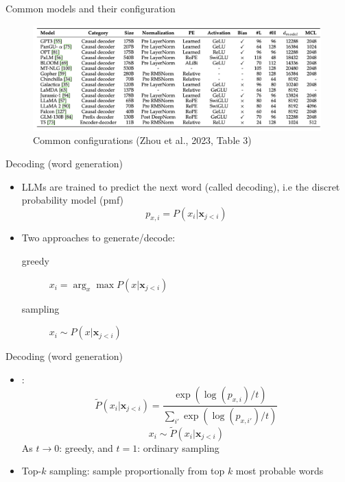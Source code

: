 \documentclass[10pt]{beamer}
\begin{document}
\begin{frame}{Common models and their configuration}

\begin{figure}[h]
\centering
\includegraphics[width=0.99\textwidth]{fig/zhou_2023_tab3}
\caption{Common configurations (Zhou et al., 2023, Table 3)}
\end{figure}

\end{frame}


\begin{frame}{Decoding (word generation)}

\begin{itemize}
\item LLMs are trained to predict the next word (called decoding), i.e the discret probability model (pmf)
\[
p_{x,i} = P(x_i|\mathbf{x}_{j<i})
\]
\pause
\item Two approaches to generate/decode:
\begin{description}
\item[greedy] $x_i = \arg_x \max P(x|\mathbf{x}_{j<i})$
\item[sampling] $x_i \sim P(x|\mathbf{x}_{j<i})$
\end{description}
\end{itemize}

\end{frame}


\begin{frame}{Decoding (word generation)}

\begin{itemize}
\item {}:
\[
\tilde{P}(x_i|\mathbf{x}_{j<i}) = \frac{\exp(\log(p_{x,i})/t)}{\sum_{i'} \exp(\log(p_{x,i'})/t)}
\]
\[
x_i \sim \tilde{P}(x_i|\mathbf{x}_{j<i})
\]
As $t\rightarrow 0$: greedy, and $t = 1$: ordinary sampling
\pause
\item Top-$k$ sampling: sample proportionally from top $k$ most probable words
\end{itemize}

\end{frame}
\end{document}

